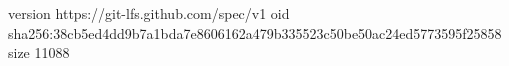 version https://git-lfs.github.com/spec/v1
oid sha256:38cb5ed4dd9b7a1bda7e8606162a479b335523c50be50ac24ed5773595f25858
size 11088
